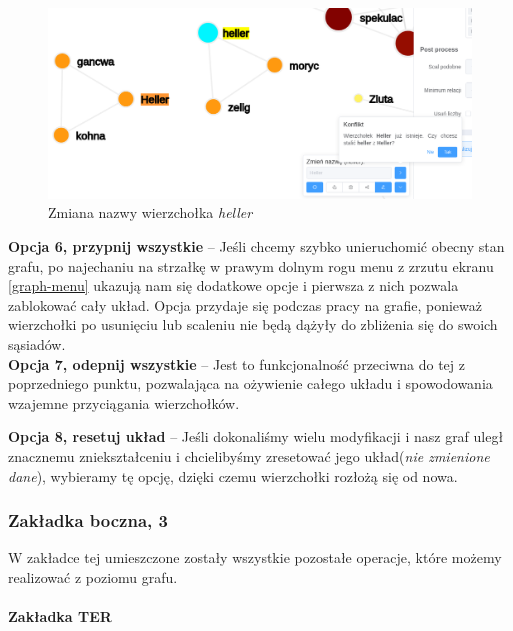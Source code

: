 \documentclass[12pt, a4paper]{article}
\newcommand{\subsubsubsection}[1]{\paragraph{#1}\mbox{}\\}
\begin{document}
\begin{figure}[H]
    \centering
    \includegraphics[width=\linewidth]{images/graph-change-name-heller.png}
    \caption{Zmiana nazwy wierzchołka \textit{heller}}
\end{figure}


\noindent \textbf{Opcja 6, przypnij wszystkie} -- Jeśli chcemy szybko unieruchomić obecny stan grafu, po najechaniu na strzałkę w prawym dolnym rogu menu z zrzutu ekranu \ref{graph-menu} ukazują nam się dodatkowe opcje i pierwsza z nich pozwala zablokować cały układ. Opcja przydaje się podczas pracy na grafie, ponieważ wierzchołki po usunięciu lub scaleniu nie będą dążyły do zbliżenia się do swoich sąsiadów.\\

\noindent \textbf{Opcja 7, odepnij wszystkie} -- Jest to funkcjonalność przeciwna do tej z poprzedniego punktu, pozwalająca na ożywienie całego układu i spowodowania wzajemne przyciągania wierzchołków.

\noindent \textbf{Opcja 8, resetuj układ} -- Jeśli dokonaliśmy wielu modyfikacji i nasz graf uległ znacznemu zniekształceniu i chcielibyśmy zresetować jego układ(\textit{nie zmienione dane}), wybieramy tę opcję, dzięki czemu wierzchołki rozłożą się od nowa.

\subsubsection{Zakładka boczna, 3}

W zakładce tej umieszczone zostały wszystkie pozostałe operacje, które możemy realizować z poziomu grafu.

\subsubsubsection{Zakładka TER}
\end{document}

